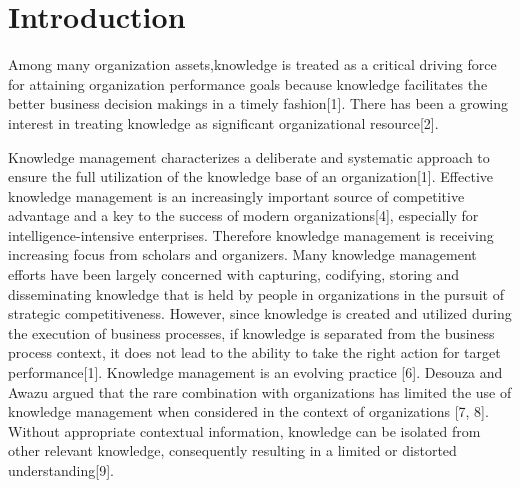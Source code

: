 \documentclass[doublespacing]{elsarticle}
\begin{document}
\section{Introduction}
\label{sec:introduction}
Among many organization assets,knowledge is treated as a critical
driving force for attaining organization performance goals because
knowledge facilitates the better business decision makings in a timely
fashion[1]. There has been a growing interest in treating knowledge as
significant organizational resource[2].


Knowledge management characterizes a deliberate and systematic
approach to ensure the full utilization of the knowledge base of an
organization[1]. Effective knowledge management is an increasingly
important source of competitive advantage and a key to the success of
modern organizations[4], especially for intelligence-intensive
enterprises. Therefore knowledge management is receiving increasing
focus from scholars and organizers.  Many knowledge management efforts have been largely concerned with capturing, codifying, storing and disseminating knowledge that is held by people in organizations in the pursuit of strategic competitiveness. However, since knowledge is created and utilized during the execution of business processes, if knowledge is separated from the business process context, it does not lead to the ability to take the right action for target performance[1]. Knowledge management is an evolving practice [6]. Desouza and Awazu argued that the rare combination with organizations has limited the use of knowledge management when considered in the context of organizations [7, 8].  Without appropriate contextual
information, knowledge can be isolated from other relevant
knowledge, consequently resulting in a limited or distorted
understanding[9].
\end{document}
